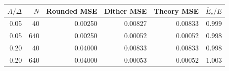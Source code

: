 \begin{tabular}{rrrrrr}
\toprule
$A/\Delta$ & $N$ & Rounded MSE & Dither MSE & Theory MSE & $\overline E_c/E$\\
\midrule
0.05 & 40 & 0.00250 & 0.00827 & 0.00833 & 0.999 \\
0.05 & 640 & 0.00250 & 0.00052 & 0.00052 & 0.998 \\
0.20 & 40 & 0.04000 & 0.00833 & 0.00833 & 0.998 \\
0.20 & 640 & 0.04000 & 0.00053 & 0.00052 & 1.003 \\
\bottomrule
\end{tabular}
